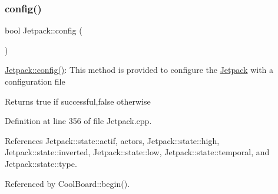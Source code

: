 \subsubsection{\texorpdfstring{config()}{config()}}
{\footnotesize\ttfamily bool Jetpack\+::config (\begin{DoxyParamCaption}{ }\end{DoxyParamCaption})}

\hyperlink{classJetpack_ab065ee83e244265a2223a22f3ee4a719}{Jetpack\+::config()}\+: This method is provided to configure the \hyperlink{classJetpack}{Jetpack} with a configuration file

\begin{DoxyReturn}{Returns}
true if successful,false otherwise 
\end{DoxyReturn}


Definition at line 356 of file Jetpack.\+cpp.



References Jetpack\+::state\+::actif, actors, Jetpack\+::state\+::high, Jetpack\+::state\+::inverted, Jetpack\+::state\+::low, Jetpack\+::state\+::temporal, and Jetpack\+::state\+::type.



Referenced by Cool\+Board\+::begin().


